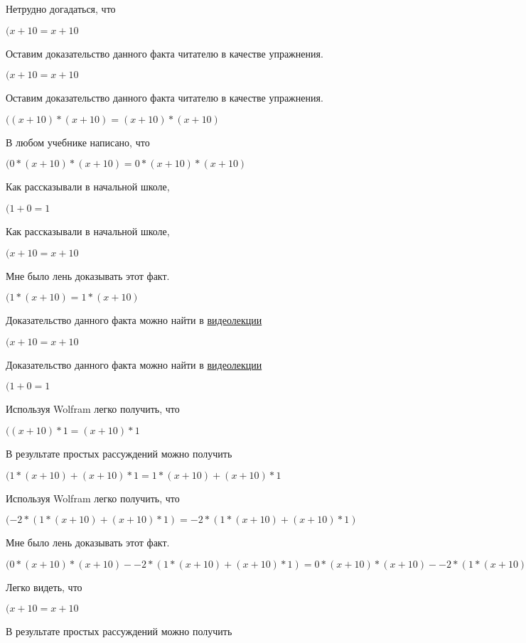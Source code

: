\documentclass[12pt,a4paper,fleqn]{article}
\theoremstyle{definition}
\begin{document}
Нетрудно догадаться, что

$( x  +  10  =  x  +  10 $

Оставим доказательство данного факта читателю в качестве упражнения.

$( x  +  10  =  x  +  10 $

Оставим доказательство данного факта читателю в качестве упражнения.

$(( x  +  10 ) * ( x  +  10 ) = ( x  +  10 ) * ( x  +  10 )$

В любом учебнике написано, что

$( 0  * ( x  +  10 ) * ( x  +  10 ) =  0  * ( x  +  10 ) * ( x  +  10 )$

Как рассказывали в начальной школе,

$( 1  +  0  =  1 $

Как рассказывали в начальной школе,

$( x  +  10  =  x  +  10 $

Мне было лень доказывать этот факт.

$( 1  * ( x  +  10 ) =  1  * ( x  +  10 )$

Доказательство данного факта можно найти в \href{https://www.youtube.com/watch?v=dQw4w9WgXcQ}{видеолекции}

$( x  +  10  =  x  +  10 $

Доказательство данного факта можно найти в \href{https://www.youtube.com/watch?v=dQw4w9WgXcQ}{видеолекции}

$( 1  +  0  =  1 $

Используя Wolfram легко получить, что

$(( x  +  10 ) *  1  = ( x  +  10 ) *  1 $

В результате простых рассуждений можно получить

$( 1  * ( x  +  10 ) + ( x  +  10 ) *  1  =  1  * ( x  +  10 ) + ( x  +  10 ) *  1 $

Используя Wolfram легко получить, что

$( -2  * ( 1  * ( x  +  10 ) + ( x  +  10 ) *  1 ) =  -2  * ( 1  * ( x  +  10 ) + ( x  +  10 ) *  1 )$

Мне было лень доказывать этот факт.

$( 0  * ( x  +  10 ) * ( x  +  10 ) -  -2  * ( 1  * ( x  +  10 ) + ( x  +  10 ) *  1 ) =  0  * ( x  +  10 ) * ( x  +  10 ) -  -2  * ( 1  * ( x  +  10 ) + ( x  +  10 ) *  1 )$

Легко видеть, что

$( x  +  10  =  x  +  10 $

В результате простых рассуждений можно получить
\end{document}
